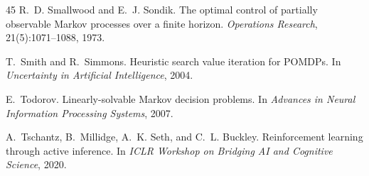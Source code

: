\documentclass[runningheads]{llncs}
\begin{document}
\begin{thebibliography}{45}
R.~D. Smallwood and E.~J. Sondik.
\newblock The optimal control of partially observable {M}arkov processes over a finite horizon.
\newblock \emph{Operations Research}, 21(5):1071--1088, 1973.

T.~Smith and R.~Simmons.
\newblock Heuristic search value iteration for {POMDP}s.
\newblock In \emph{Uncertainty in Artificial Intelligence}, 2004.

E.~Todorov.
\newblock Linearly-solvable {M}arkov decision problems.
\newblock In \emph{Advances in Neural Information Processing Systems}, 2007.

A.~Tschantz, B.~Millidge, A.~K. Seth, and C.~L. Buckley.
\newblock Reinforcement learning through active inference.
\newblock In \emph{ICLR Workshop on Bridging AI and Cognitive Science}, 2020.

\end{thebibliography}
\end{document}
